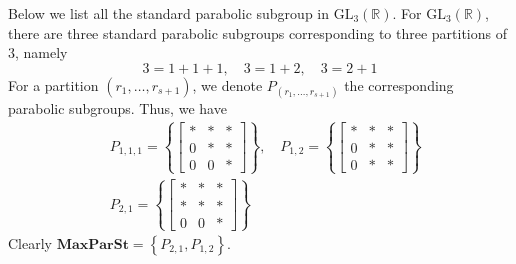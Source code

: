 \begin{example}
    Below we list all the standard parabolic subgroup in $\text{GL}_3(\mathbb{R})$.
 For $\text{GL}_3(\mathbb{R})$, there are three standard parabolic subgroups corresponding to
              three partitions of $3$, namely
              \[ 3 = 1+ 1+ 1, \quad 3 =1+2 , \quad 3 = 2+1\]
              For a partition $(r_1,\ldots,r_{s+1})$, we denote $P_{(r_1,\ldots,r_{s+1})}$ the corresponding parabolic subgroups. Thus, we have
              \begin{align*}
                   & P_{1,1,1} = \left\lbrace \begin{bmatrix}
                                                  \ast & \ast & \ast \\
                                                  0    & \ast & \ast \\
                                                  0    & 0    & \ast
                                              \end{bmatrix}\right\rbrace, \quad P_{1,2} =\left\lbrace \begin{bmatrix}
                                                                                                          \ast & \ast & \ast \\
                                                                                                          0    & \ast & \ast \\
                                                                                                          0    & \ast & \ast
                                                                                                      \end{bmatrix}\right\rbrace \\
                   & P_{2,1} = \left\lbrace \begin{bmatrix}
                                                \ast & \ast & \ast \\
                                                \ast & \ast & \ast \\
                                                0    & 0    & \ast
                                            \end{bmatrix}\right\rbrace
              \end{align*}
              Clearly $\textbf{MaxParSt} = \left\lbrace P_{2,1}, P_{1,2}\right\rbrace$.
\end{example}
